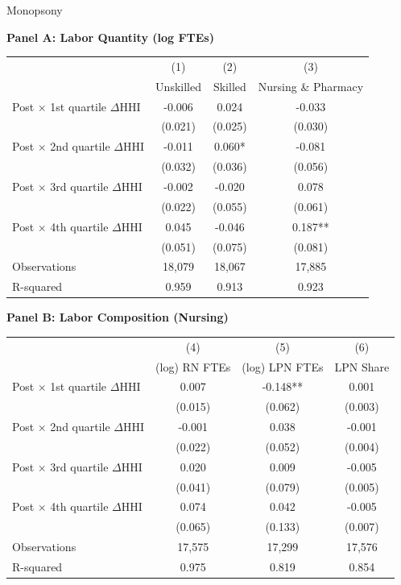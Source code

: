 \documentclass{beamer}
\begin{document}
\begin{frame}{Monopsony}
\scriptsize
\setlength{\tabcolsep}{4pt}
\renewcommand{\arraystretch}{0.3}

\textbf{Panel A: Labor Quantity (log FTEs)}

\begin{tabular}{lccc}
\toprule
& (1) & (2) & (3) \\
& Unskilled & Skilled & Nursing \& Pharmacy \\
\midrule
Post $\times$ 1st quartile $\Delta$HHI & -0.006 & 0.024 & -0.033 \\
                                       & (0.021) & (0.025) & (0.030) \\
Post $\times$ 2nd quartile $\Delta$HHI & -0.011 & 0.060* & -0.081 \\
                                       & (0.032) & (0.036) & (0.056) \\
Post $\times$ 3rd quartile $\Delta$HHI & -0.002 & -0.020 & 0.078 \\
                                       & (0.022) & (0.055) & (0.061) \\
Post $\times$ 4th quartile $\Delta$HHI & 0.045 & -0.046 & 0.187** \\
                                       & (0.051) & (0.075) & (0.081) \\
\addlinespace
Observations & 18,079 & 18,067 & 17,885 \\
R-squared    & 0.959  & 0.913  & 0.923 \\
\bottomrule
\end{tabular}

\medskip
\textbf{Panel B: Labor Composition (Nursing)}

\begin{tabular}{lccc}
\toprule
& (4) & (5) & (6) \\
& (log) RN FTEs & (log) LPN FTEs & LPN Share \\
\midrule
Post $\times$ 1st quartile $\Delta$HHI & 0.007 & -0.148** & 0.001 \\
                                       & (0.015) & (0.062) & (0.003) \\
Post $\times$ 2nd quartile $\Delta$HHI & -0.001 & 0.038 & -0.001 \\
                                       & (0.022) & (0.052) & (0.004) \\
Post $\times$ 3rd quartile $\Delta$HHI & 0.020 & 0.009 & -0.005 \\
                                       & (0.041) & (0.079) & (0.005) \\
Post $\times$ 4th quartile $\Delta$HHI & 0.074 & 0.042 & -0.005 \\
                                       & (0.065) & (0.133) & (0.007) \\
\addlinespace
Observations & 17,575 & 17,299 & 17,576 \\
R-squared    & 0.975  & 0.819  & 0.854 \\
\bottomrule
\end{tabular}


\end{frame}
\end{document}
